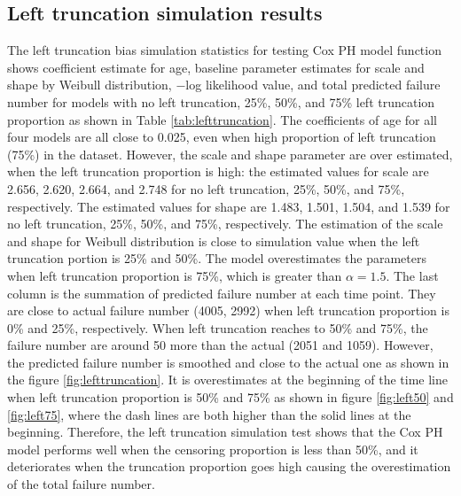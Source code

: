 \subsection{Left truncation simulation results}
The left truncation bias simulation statistics for testing Cox PH model function shows coefficient estimate for age, baseline parameter estimates for scale and shape by Weibull distribution, $-$log likelihood value, and total predicted failure number for models with no left truncation, 25\%, 50\%, and 75\% left truncation proportion as shown in Table \ref{tab:lefttruncation}. The coefficients of age for all four models are all close to 0.025, even when high proportion of left truncation (75\%) in the dataset. However, the scale and shape parameter are over estimated, when the left truncation proportion is high: the estimated values for scale are 2.656, 2.620, 2.664, and 2.748 for no left truncation, 25\%, 50\%, and 75\%, respectively. The estimated values for shape are 1.483, 1.501, 1.504, and 1.539 for no left truncation, 25\%, 50\%, and 75\%, respectively. The estimation of the scale and shape for Weibull  distribution is close to simulation value when the left truncation portion is 25\% and 50\%. The model overestimates the parameters when left truncation proportion is 75\%, which is greater than $\alpha=1.5$. The last column is the summation of predicted failure number at each time point. They are close to actual failure number (4005, 2992) when left truncation proportion is 0\% and 25\%, respectively. When left truncation reaches to 50\% and 75\%, the failure number are around 50 more than the actual (2051 and 1059). However, the predicted failure number is smoothed and close to the actual one as shown in the figure \ref{fig:lefttruncation}. It is overestimates at the beginning of the time line when left truncation proportion is 50\% and 75\% as shown in figure \ref{fig:left50} and \ref{fig:left75}, where the dash lines are both higher than the solid lines at the beginning. 
Therefore, the left truncation simulation test shows that the Cox PH model performs well when the censoring proportion is less than 50\%, and it deteriorates when the truncation proportion goes high causing the overestimation of the total failure number.
